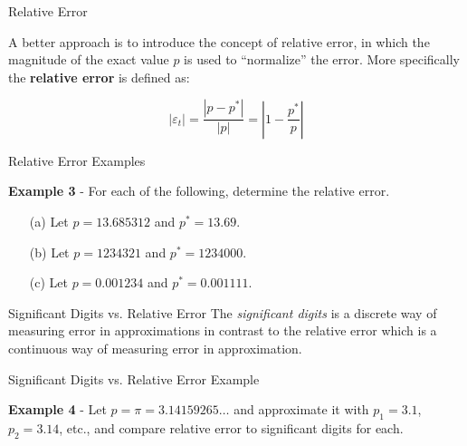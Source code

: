 \documentclass[12pt]{beamer}
\begin{document}
\begin{frame}{Relative Error} 

A better approach is to introduce the concept of relative error, in
which the magnitude of the exact value $p$ is used to ``normalize''
the error. More specifically the {\bf relative error} is defined as: 

\begin{equation} 
|\varepsilon_{t}| = \frac{|p - p^{*}|}{|p|} = |1 - \frac{p^{*}}{p}| 
\end{equation} 

\end{frame} 

\begin{frame}{Relative Error Examples}

{\bf Example 3} - For each of the following, determine the relative error.
\begin{enumerate}
\item[(a)]{Let $p=13.685312$ and $p^*=13.69$.}
\vspace{0.5 in}
\item[(b)]{Let $p=1234321$ and $p^*=1234000$.} 
\vspace{0.5 in}
\item[(c)]{Let $p=0.001234$ and $p^*=0.001111$.}
\vspace{0.5 in}
\end{enumerate}
\end{frame}

\begin{frame}{Significant Digits vs. Relative Error} 
The {\it significant digits} is a discrete way of measuring error in
approximations in contrast to the relative error which is a continuous
way of measuring error in approximation. 
\end{frame}

\begin{frame}{Significant Digits vs. Relative Error Example } 

{\bf Example 4} - Let $p = \pi = 3.14159265 \dots$ and approximate it with $p_1=3.1$, $p_2=3.14$, etc., and compare relative error to significant digits for each.

\vspace{3 in}
\end{frame}
\end{document}
